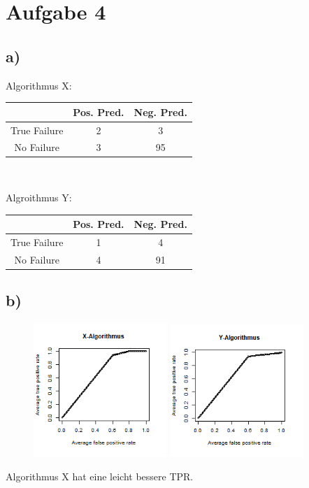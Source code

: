 \section*{Aufgabe 4}
\subsection*{a)}
\begin{multicols}{2}
	\raggedright
	Algorithmus X:\\
	\begin{center}
		\begin{tabular}{|c|c|c|}\hline
			& Pos. Pred. &Neg. Pred.\\\hline
			True Failure &2& 3\\\hline
			No Failure&3&95\\\hline
		\end{tabular}\\
	\end{center}
\columnbreak
	Algroithmus Y:\\
	\begin{center}\begin{tabular}{|c|c|c|}\hline
			& Pos. Pred. &Neg. Pred.\\\hline
			True Failure &1& 4\\\hline
			No Failure&4&91\\\hline
		\end{tabular}
	\end{center}
\end{multicols}
\subsection*{b)}
\begin{center}
	\begin{figure}[h]
		\centering
		\includegraphics[width=0.45\textwidth]{../4/Screenshots/X.png}
		\includegraphics[width=0.45\textwidth]{../4/Screenshots/Y.png}
	\end{figure}
 	Algorithmus X hat eine leicht bessere TPR.
\end{center}


